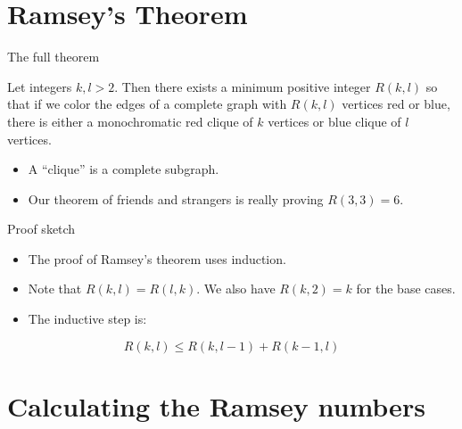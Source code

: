 \documentclass[aspectratio=169]{beamer}
\begin{document}
\section{Ramsey's Theorem}
\frame{\sectionpage}

\begin{frame}{The full theorem}
    \begin{theorem}
        Let integers $k, l > 2$. Then there exists a minimum positive integer $R(k, l)$ so that if we color the edges of a complete graph with $R(k, l)$ vertices red or blue, there is either a monochromatic red clique of $k$ vertices or blue clique of $l$ vertices. \cite{Bona06}
    \end{theorem}
    \begin{itemize}
        \item A ``clique'' is a complete subgraph.
        \item Our theorem of friends and strangers is really proving $R(3,3) = 6.$
    \end{itemize}
    
\end{frame}


\begin{frame}{Proof sketch}
    \begin{itemize}
        \item The proof of Ramsey's theorem uses induction.
        \item Note that $R(k,l) = R(l,k)$. We also have $R(k, 2) = k$ for the base cases.
        \item The inductive step is:
    \end{itemize}
    \[
        R(k, l) \leq R(k, l-1) + R(k-1, l)
    \]
\end{frame}

\section{Calculating the Ramsey numbers}
\frame{\sectionpage}
\end{document}
